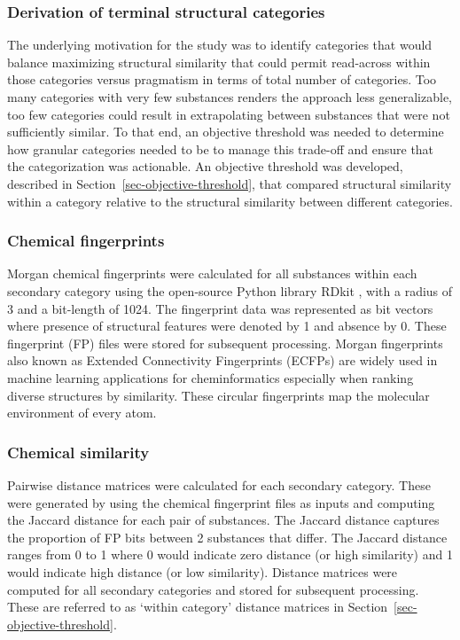 \documentclass[
  super,
  preprint,
  3p]{elsarticle}
\begin{document}
\hypertarget{sec-term-cat}{%
\subsubsection{Derivation of terminal structural
categories}\label{sec-term-cat}}

The underlying motivation for the study was to identify categories that
would balance maximizing structural similarity that could permit
read-across within those categories versus pragmatism in terms of total
number of categories. Too many categories with very few substances
renders the approach less generalizable, too few categories could result
in extrapolating between substances that were not sufficiently similar.
To that end, an objective threshold was needed to determine how granular
categories needed to be to manage this trade-off and ensure that the
categorization was actionable. An objective threshold was developed,
described in Section~\ref{sec-objective-threshold}, that compared
structural similarity within a category relative to the structural
similarity between different categories.

\hypertarget{sec-fingerprints}{%
\subsubsection{Chemical fingerprints}\label{sec-fingerprints}}

Morgan chemical fingerprints \citep{rogers_extended-connectivity_2010}
were calculated for all substances within each secondary category using
the open-source Python library RDkit \citep{landrum_rdkit}, with a
radius of 3 and a bit-length of 1024. The fingerprint data was
represented as bit vectors where presence of structural features were
denoted by 1 and absence by 0. These fingerprint (FP) files were stored
for subsequent processing. Morgan fingerprints also known as Extended
Connectivity Fingerprints (ECFPs) are widely used in machine learning
applications for cheminformatics \citep{oboyle_comparing_2016}
especially when ranking diverse structures by similarity. These circular
fingerprints map the molecular environment of every atom.

\hypertarget{sec-chem-sim}{%
\subsubsection{Chemical similarity}\label{sec-chem-sim}}

Pairwise distance matrices were calculated for each secondary category.
These were generated by using the chemical fingerprint files as inputs
and computing the Jaccard distance for each pair of substances. The
Jaccard distance captures the proportion of FP bits between 2 substances
that differ\citep{raymond_comparison_2003}. The Jaccard distance ranges
from 0 to 1 where 0 would indicate zero distance (or high similarity)
and 1 would indicate high distance (or low similarity). Distance
matrices were computed for all secondary categories and stored for
subsequent processing. These are referred to as `within category'
distance matrices in Section~\ref{sec-objective-threshold}.
\end{document}
